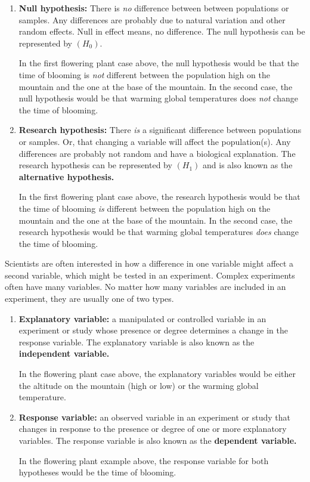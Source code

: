 \documentclass[12pt]{exam}
\begin{document}
\begin{enumerate}
	\item \textbf{Null hypothesis:} There is \emph{no} difference between between populations or samples.
	Any differences are probably due to natural variation and other random effects. Null in effect means, no difference. The null hypothesis can be represented by $\left(H_0\right)$.
	
	In the first flowering plant case above, the null hypothesis would be that the 
	time of blooming is \emph{not} different between the population high on the mountain 
	and the one at the base of the mountain. In the second case, the null
	hypothesis would be that warming global temperatures does \emph{not} change the time
	of blooming.
	
	\item \textbf{Research hypothesis:} There \emph{is} a significant difference between populations or samples. Or,  that changing a variable will affect the population(s). Any differences are probably not random
	and have a biological explanation. The research hypothesis can be represented by $\left(H_1\right)$ and is also known as the \textbf{alternative
	hypothesis.}
	
	In the first flowering plant case above, the research hypothesis would be that the 
	time of blooming \emph{is} different between the population high on the mountain 
	and the one at the base of the mountain. In the second case, the research
	hypothesis would be that warming global temperatures \emph{does} change the time
	of blooming.

\end{enumerate}

Scientists are often interested in how a difference in one variable might 
affect a second variable, which might be tested in an experiment. Complex 
experiments often have many variables. No matter how many variables
are included in an experiment, they are usually one of two types.

\begin{enumerate}
\item
  \textbf{Explanatory variable:} a manipulated or controlled variable in an experiment
  or study whose presence or degree determines a change in the response
  variable. The explanatory variable is also known as the \textbf{independent
  variable.}
  
  In the flowering plant case above, the explanatory variables would be
  either the altitude on the mountain (high or low) or the warming global 
  temperature.
   
\item
  \textbf{Response variable:} an observed variable in an experiment or
  study that changes in response to the presence or degree of one
  or more explanatory variables. The response variable is also known as the
  \textbf{dependent variable.} 
  
  In the flowering plant example above, the response variable for both
  hypotheses would be the time of blooming.
  
\end{enumerate}
\end{document}
